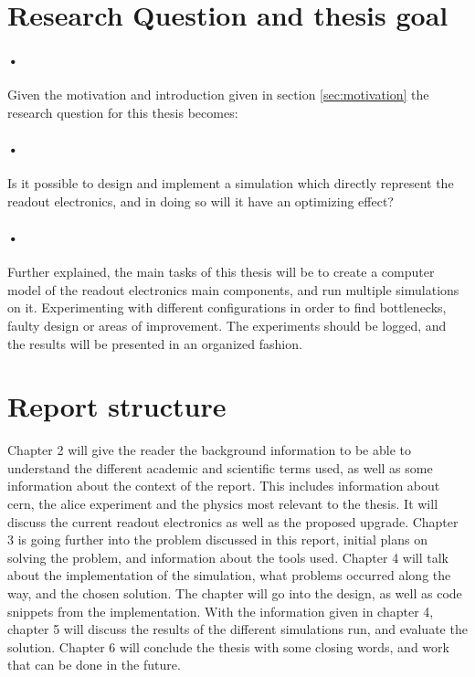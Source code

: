 \documentclass[a4paper]{report}
\begin{document}
\section{Research Question and thesis goal}

\paragraph{•}
Given the motivation and introduction given in section \ref{sec:motivation} the research question for this thesis becomes:

\paragraph{•}
Is it possible to design and implement a simulation which directly represent the readout electronics, and in doing so will it have an optimizing effect?

\paragraph{•}
Further explained, the main tasks of this thesis will be to create a computer model of the readout electronics main components, and run multiple simulations on it.
Experimenting with different configurations in order to find bottlenecks, faulty design or areas of improvement.
The experiments should be logged, and the results will be presented in an organized fashion.


\section{Report structure}
Chapter 2 will give the reader the background information to be able to understand the different academic and scientific terms used, as well as some information about the context of the report. 
This includes information about \gls{cern}, the \gls{alice} experiment and the physics most relevant to the thesis.
It will discuss the current readout electronics as well as the proposed upgrade.
Chapter 3 is going further into the problem discussed in this report, initial plans on solving the problem, and information about the tools used.
Chapter 4 will talk about the implementation of the simulation, what problems occurred along the way, and the chosen solution. 
The chapter will go into the design, as well as code snippets from the implementation.
With the information given in chapter 4, chapter 5 will discuss the results of the different simulations run, and evaluate the solution.
Chapter 6 will conclude the thesis with some closing words, and work that can be done in the future.
\end{document}
